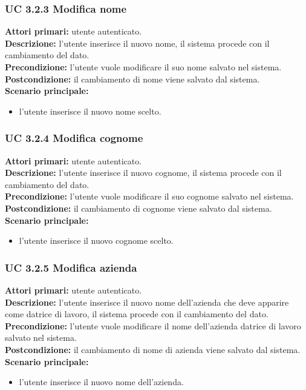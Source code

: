 \subsubsection{UC 3.2.3 Modifica nome}
\noindent
\textbf{Attori primari:} utente autenticato.\\
\textbf{Descrizione:} l'utente inserisce il nuovo nome, il sistema procede con il cambiamento del dato.\\
\textbf{Precondizione:} l'utente vuole modificare il suo nome salvato nel sistema.\\
\textbf{Postcondizione:} il cambiamento di nome viene salvato dal sistema.\\
\textbf{Scenario principale:}
\begin{itemize}
\item l'utente inserisce il nuovo nome scelto.
\end{itemize}

\subsubsection{UC 3.2.4 Modifica cognome}
\noindent
\textbf{Attori primari:} utente autenticato.\\
\textbf{Descrizione:} l'utente inserisce il nuovo cognome, il sistema procede con il cambiamento del dato.\\
\textbf{Precondizione:} l'utente vuole modificare il suo cognome salvato nel sistema.\\
\textbf{Postcondizione:} il cambiamento di cognome viene salvato dal sistema.\\
\textbf{Scenario principale:}
\begin{itemize}
\item l'utente inserisce il nuovo cognome scelto.
\end{itemize}

\subsubsection{UC 3.2.5 Modifica azienda}
\noindent
\textbf{Attori primari:} utente autenticato.\\
\textbf{Descrizione:} l'utente inserisce il nuovo nome dell'azienda che deve apparire come datrice di lavoro, il sistema procede con il cambiamento del dato.\\
\textbf{Precondizione:} l'utente vuole modificare il nome dell'azienda datrice di lavoro salvato nel sistema.\\
\textbf{Postcondizione:} il cambiamento di nome di azienda viene salvato dal sistema.\\
\textbf{Scenario principale:}
\begin{itemize}
\item l'utente inserisce il nuovo nome dell'azienda.
\end{itemize}

